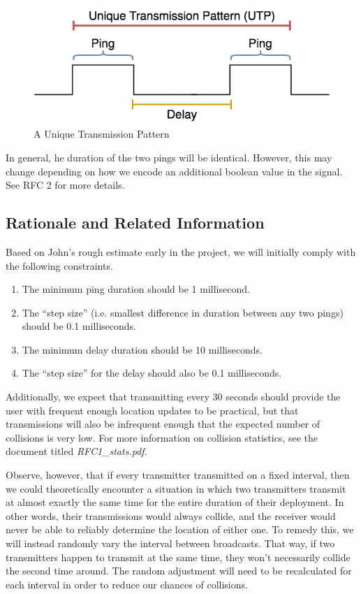 \documentclass[12pt]{article}
\begin{document}
\begin{figure}[h]
\centering
\includegraphics[scale=0.5]{utp}

\caption{A Unique Transmission Pattern}\label{fig:utp}
\end{figure}

In general, he duration of the two pings will be identical.
However, this may change depending on how we encode an additional boolean
value in the signal.
See RFC 2 for more details.

\subsection{Rationale and Related Information} \label{rationale}

Based on John's rough estimate early in the project, we will initially
comply with the following constraints.

\begin{enumerate} \itemsep -2pt
	\item The minimum ping duration should be 1 millisecond.
	\item The ``step size'' (i.e. smallest difference in duration between
		any two pings) should be 0.1 milliseconds.
	\item The minimum delay duration should be 10 milliseconds.
	\item The ``step size'' for the delay should also be 0.1 milliseconds.
\end{enumerate}

Additionally, we expect that transmitting every 30 seconds should provide
the user with frequent enough location updates to be practical, but that
transmissions will also be
infrequent enough that the expected number of collisions is very low.
For more information on collision statistics, see the document titled
{\em RFC1\_stats.pdf}.

Observe, however, that if every transmitter transmitted on a fixed interval,
then we could theoretically encounter a situation in which two transmitters
transmit at almost exactly the same time for the entire duration of their
deployment.
In other words, their transmissions would always collide, and the receiver
would never be able to reliably determine the location of either one.
To remedy this, we will instead randomly vary the interval between broadcasts.
That way, if two transmitters happen to transmit at the same time,
they won't necessarily collide the second time around.
The random adjustment will need to be recalculated for each interval in order
to reduce our chances of collisions.
\end{document}
